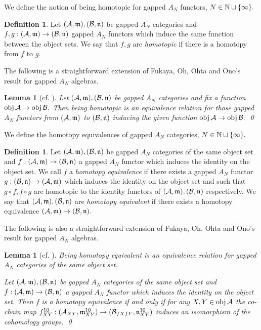\documentclass{article}
\theoremstyle{plain}%
\newtheorem{lem}[thm]{Lemma}
\theoremstyle{definition}
\newtheorem{dfn}[thm]{Definition}
\numberwithin{equation}{section}
\numberwithin{figure}{section}
\def\l{\label}
\def\fm{{\mathfrak m}}
\def\fn{{\mathfrak n}}
\def\cA{{\mathbin{\cal A}}}
\def\cB{{\mathbin{\cal B}}}
\def\iy{\infty}
\def\cm{\circ}
\begin{document}
We define the notion of being homotopic for gapped $A_N$ functors, $N\in\N\sqcup\{\iy\}.$
\begin{dfn}
Let $(\cA,\fm),(\cB,\fn)$ be gapped $A_N$ categories and $f,g:(\cA,\fm)\to(\cB,\fn)$ gapped $A_N$ functors which induce the same function between the object sets.
We say that $f,g$ are {\it homotopic} if there is a homotopy from $f$ to $g.$
\end{dfn}
The following is a straightforward extension of Fukaya, Oh, Ohta and Ono's result for gapped $A_N$ algebras.
\begin{lem}[cf.\! {\cite[Proposition 4.2.37]{FOOO}}]
Let $(\cA,\fm),(\cB,\fn)$ be gapped $A_N$ categories and fix a function $\obj\cA\to\obj\cB.$ 
Then being homotopic is an equivalence relation for those gapped $A_N$ functors from $(\cA,\fm)$ to $(\cB,\fn)$ inducing the given function $\obj\cA\to\obj\cB.$ \qed
\end{lem}

We define the homotopy equivalences of gapped $A_N$ categories, $N\in\N\sqcup\{\iy\}.$
\begin{dfn}
Let $(\cA,\fm),(\cB,\fn)$ be gapped $A_N$ categories of the same object set and $f:(\cA,\fm)\to(\cB,\fn)$ a gapped $A_N$ functor which induces the identity on the object set.
We call $f$ a {\it homotopy equivalence} if there exists a gapped $A_N$ functor $g:(\cB,\fn)\to(\cA,\fm)$ which induces the identity on the object set and such that $g\cm f,f\cm g$ are homotopic to the identity functors of $(\cA,\fm),(\cB,\fn)$ respectively.
We say that $(\cA,\fm),(\cB,\fn)$ are {\it homotopy equivalent} if there exists a homotopy equivalence $(\cA,\fm)\to(\cB,\fn).$
\end{dfn}
The following is also a straightforward extension of Fukaya, Oh, Ohta and Ono's result for gapped $A_N$ algebras.
\begin{lem}[cf.\! {\cite[Corollary 4.2.44 and Remark 7.2.71]{FOOO}}]
\l{thm: A_N Whitehead}
Being homotopy equivalent is an equivalence relation for gapped $A_N$ categories of the same object set.

Let $(\cA,\fm),(\cB,\fn)$ be gapped $A_N$ categories of the same object set and $f:(\cA,\fm)\to(\cB,\fn)$ a gapped $A_N$ functor which induces the identity on the object set.
Then $f$ is a homotopy equivalence if and only if for any $X,Y\in\obj \cA$ the co-chain map $f^{10}_{XY}:(\cA_{XY},\fm^{10}_{XY})\to (\cB_{fXfY},\fn^{10}_{XY})$ induces an isomorphism of the cohomology groups. \qed
\end{lem}
\end{document}
